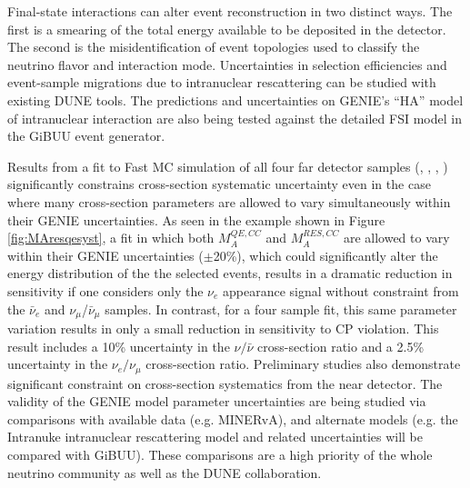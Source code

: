 Final-state interactions can alter event reconstruction in two distinct ways. The first is a smearing
of the total energy available to be deposited in the detector. The second is the misidentification of
event topologies used to classify the neutrino flavor and interaction mode. Uncertainties in selection
efficiencies and event-sample migrations
due to intranuclear rescattering can be studied with existing DUNE tools. The predictions and
uncertainties on GENIE's ``HA'' model of intranuclear interaction
are also being tested against the detailed FSI model in the GiBUU event
generator.

Results from a fit to Fast MC simulation of all four far detector samples
(\nue, \anue, \numu, \anumu) significantly
constrains cross-section systematic uncertainty even in the case where many
cross-section parameters are allowed to vary simultaneously within their
GENIE uncertainties. As seen in the example shown in Figure
\ref{fig:MAresqesyst}, 
a fit in which both $M_A^{QE,CC}$ and 
$M_A^{RES,CC}$ are allowed to vary within their GENIE uncertainties 
($\pm$20\%), which could significantly alter the energy distribution of the 
the selected events, results in a dramatic reduction in sensitivity if one 
considers only the $\nu_e$ appearance signal without constraint from the 
$\bar{\nu}_e$ and $\nu_{\mu}$/$\bar{\nu}_{\mu}$ samples.
In contrast, for a four sample fit,
this same parameter variation results in only a small reduction in
sensitivity to CP violation.
This result includes a 10\% uncertainty in the $\nu/\bar{\nu}$
cross-section ratio and a 2.5\% uncertainty in the $\nu_e/\nu_{\mu}$
cross-section ratio.
Preliminary studies also
demonstrate significant constraint on cross-section systematics from the 
near detector. The validity of the GENIE model parameter uncertainties are being studied 
via comparisons with available data (e.g. MINERvA), and alternate models (e.g. the 
Intranuke intranuclear rescattering model and related uncertainties will be compared with GiBUU).
These comparisons are a high priority of the whole neutrino community as well as the DUNE collaboration.
%
